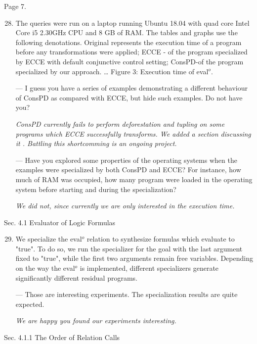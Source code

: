 Page 7.

\begin{enumerate}
  \setcounter{enumi}{27}

  \item {The queries were run on a laptop running Ubuntu 18.04 with quad core Intel Core i5 2.30GHz CPU and 8 GB of RAM. The tables and graphs use the following denotations. Original represents the execution time of a program before any transformations were applied; ECCE - of the program specialized by ECCE with default conjunctive control setting; ConsPD-of the program specialized by our approach. … Figure 3: Execution time of eval$^o$.

  --- I guess you have a series of examples demonstrating a different behaviour of ConsPD as compared with ECCE, but hide such examples. Do not have you?

  \emph{ConsPD currently fails to perform deforestation and tupling on some programs which ECCE successfully transforms. We added a section discussing it . Battling this shortcomming is an ongoing project. }

  --- Have you explored some properties of the operating systems when the examples were specialized by both ConsPD and ECCE? For instance, how much of RAM was occupied, how many program were loaded in the operating system before starting and during the specialization?

  \emph{We did not, since currently we are only interested in the execution time.}
  }

\end{enumerate}

Sec. 4.1 Evaluator of Logic Formulas

\begin{enumerate}
  \setcounter{enumi}{28}
  \item {
    We specialize the eval$^o$ relation to synthesize formulas which evaluate to "true". To do so, we run the specializer for the goal with the last argument fixed to "true", while the first two arguments remain free variables. Depending on the way the eval$^o$ is implemented, different specializers generate significantly different residual programs.

    --- Those are interesting experiments. The specialization results are quite expected.

    \emph{We are happy you found our experiments interesting.}
  }
\end{enumerate}

Sec. 4.1.1 The Order of Relation Calls

